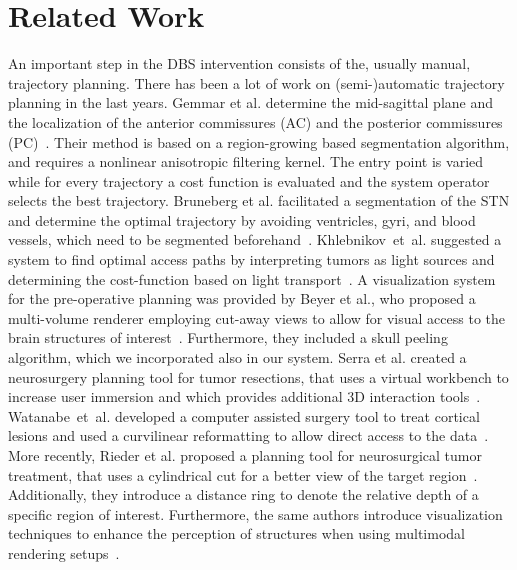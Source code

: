\documentclass[review]{vgtc}                 %
\begin{document}
\section{Related Work}\label{sec:related}
An important step in the DBS intervention consists of the, usually manual, trajectory planning. There has been a lot of work on (semi-)automatic trajectory planning in the last years. Gemmar et al. determine the mid-sagittal plane and the localization of the anterior commissures (AC) and the posterior commissures (PC)~\cite{Gemmar2008}. Their method is based on a region-growing based segmentation algorithm, and requires a nonlinear anisotropic filtering kernel. The entry point is varied while for every trajectory a cost function is evaluated and the system operator selects the best trajectory. Bruneberg et al. facilitated a segmentation of the STN and determine the optimal trajectory by avoiding ventricles, gyri, and blood vessels, which need to be segmented beforehand~\cite{Brunenberg2007}. Khlebnikov~et~al. suggested a system to find optimal access paths by interpreting tumors as light sources and determining the cost-function based on light transport~\cite{Khlebnikov2011}. A visualization system for the pre-operative planning was provided by Beyer et al., who proposed a multi-volume renderer employing cut-away views to allow for visual access to the brain structures of interest~\cite{Beyer2007}. Furthermore, they included a skull peeling algorithm, which we incorporated also in our system. Serra et al. created a neurosurgery planning tool for tumor resections, that uses a virtual workbench to increase user immersion and which provides additional 3D interaction tools~\cite{Serra1998}. Watanabe~et~al. developed a computer assisted surgery tool to treat cortical lesions and used a curvilinear reformatting to allow direct access to the data~\cite{Watanabe}.  More recently, Rieder et al. proposed a planning tool for neurosurgical tumor treatment, that uses a cylindrical cut for a better view of the target region~\cite{Rieder2008}. Additionally, they introduce a distance ring to denote the relative depth of a specific region of interest. Furthermore, the same authors introduce visualization techniques to enhance the perception of structures when using multimodal rendering setups~\cite{Rieder2008a}.
\end{document}
